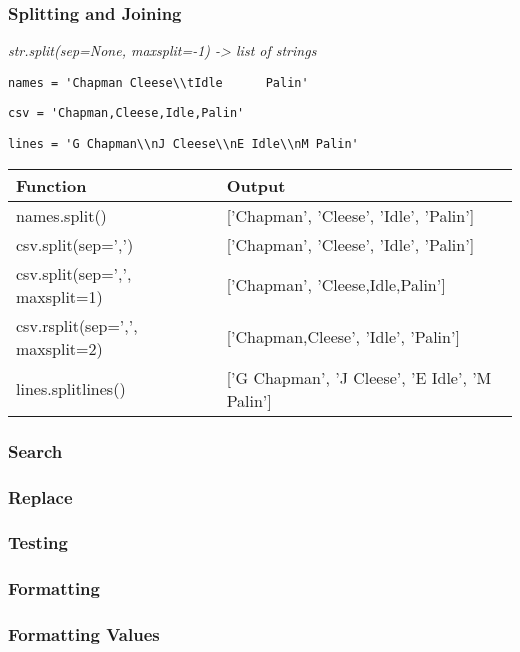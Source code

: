 \documentclass{beamer}
\begin{document}
%
%
\begin{frame}
  \frametitle{Splitting and Joining}

  \textit{str.split(sep=None, maxsplit=-1) -> list of strings}

  \lstinline{names = 'Chapman Cleese\\tIdle      Palin'}

  \lstinline{csv = 'Chapman,Cleese,Idle,Palin'}

  \lstinline{lines = 'G Chapman\\nJ Cleese\\nE Idle\\nM Palin'}
 
  \begin{table}
    \begin{tabular}{l | l}
    Function & Output \\
    \hline
    names.split() & ['Chapman', 'Cleese', 'Idle', 'Palin'] \\
    csv.split(sep=',') & ['Chapman', 'Cleese', 'Idle', 'Palin'] \\
    csv.split(sep=',', maxsplit=1) & ['Chapman', 'Cleese,Idle,Palin'] \\
    csv.rsplit(sep=',', maxsplit=2) & ['Chapman,Cleese', 'Idle', 'Palin'] \\
    lines.splitlines() & ['G Chapman', 'J Cleese', 'E Idle', 'M Palin']
    \end{tabular}
  \end{table}
\end{frame}


%
%
\begin{frame}
  \frametitle{Search}
\end{frame}


%
%
\begin{frame}
  \frametitle{Replace}
\end{frame}


%
%
\begin{frame}
  \frametitle{Testing}
\end{frame}


\begin{frame}
  \frametitle{Formatting}
\end{frame}

%
%
\begin{frame}
  \frametitle{Formatting Values} 
\end{frame}
\end{document}
